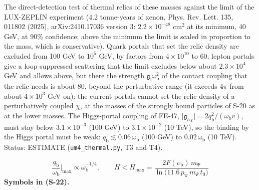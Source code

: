 \documentclass[
  10pt,
]{article}
\begin{document}
The direct-detection test of thermal relics of these masses against the
limit of the LUX-ZEPLIN experiment (4.2 tonne-years of xenon, Phys. Rev.
Lett. 135, 011802 (2025), arXiv:2410.17036 version 3:
\(2.2\times10^{-48}\) cm\(^2\) at its minimum, 40 GeV, at 90\%
confidence; above the minimum the limit is scaled in proportion to the
mass, which is conservative). Quark portals that set the relic density
are excluded from 100 GeV to \(10^5\) GeV, by factors from
\(4\times10^{10}\) to 60; lepton portals give a loop-suppressed
scattering that the limit excludes below about \(2.3\times10^4\) GeV and
allows above, but there the strength
\(\mathfrak{g}_{\mathrm{l}}\omega_{\mathrm{b}}^2\) of the contact
coupling that the relic needs is about 80, beyond the perturbative range
(it exceeds \(4\pi\) from about \(4\times10^3\) GeV on): the current
portals cannot set the relic density of a perturbatively coupled
\(\chi\), at the masses of the strongly bound particles of S-20 as at
the lower masses. The Higgs-portal coupling of FE-47,
\(\lvert\mathfrak{g}_{h\chi}\rvert = 2q_{\mathrm{b}}^2/(\omega_{\mathrm{b}}v)\),
must stay below \(3.1\times10^{-3}\) (100 GeV) to \(3.1\times10^{-2}\)
(10 TeV), so the binding by the Higgs portal must be weak:
\(q_{\mathrm{b}} \lesssim 0.06\,\omega_{\mathrm{b}}\) (100 GeV) to
\(0.02\,\omega_{\mathrm{b}}\) (10 TeV). Status: ESTIMATE
(\texttt{um4\_thermal.py}, T3 and T4).

\[
\frac{q_{\mathrm{b}}}{\omega_{\mathrm{b}}}\Big\vert_{\max} \propto \omega_{\mathrm{b}}^{-1/4},\qquad
H < H_{\max} = \frac{2F(\upsilon_{\mathrm{b}})\,m_\Psi}{\ln\big(11.6\,p_{\mathrm{w}}\,m_\Psi\,t_0\big)} \tag{S-22}
\] \textbf{Symbols in (S-22).}
\end{document}

